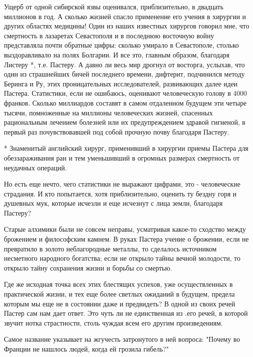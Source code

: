 Ущерб от  одной сибирской язвы оценивался,  приблизительно, в двадцать
миллионов  в год.  А сколько  жизней  спасло применение  его учения  в
хирургии и других областях медицины!  Один из наших известных хирургов
говорил  мне, что  смертность в  лазаретах Севастополя  и в  последнюю
восточную войну  представляла почти обратные цифры:  сколько умирало в
Севастополе,  столько выздоравливало  на  полях Болгарии.  И все  это,
главным  образом,  благодаря  Листеру  *, т.е.  Пастеру.  А  давно  ли
весь  мир  дрогнул  от  восторга, услыхав,  что  один  из  страшнейших
бичей последнего  времени, дифтерит,  подчинился методу Беринга  и Ру,
этих  проницательных исследователей,  развивающих далее  идеи Пастера.
Статистики,  если не  ошибаюсь, оценивают  человеческую голову  в 4000
франков.  Сколько  миллиардов  составят  в  самом  отдаленном  будущем
эти  четыре  тысячи,  помноженные  на  миллионы  человеческих  жизней,
спасенных  рациональным  лечением   болезней  или  их  предупреждением
здравой гигиеной, в первый раз почувствовавшей под собой прочную почву
благодаря Пастеру.

* Знаменитый английский хирург,  применивший в хирургии приемы Пастера
для  обеззараживания  ран  и   тем  уменьшивший  в  огромных  размерах
смертность от неудачных операций.

Но  есть  еще  нечто,  чего  статистики не  выражают  цифрами,  это  -
человеческие страдания. И кто попытается, хотя приблизительно, оценить
ту бездну горя  и душевных мук, которые исчезли и  еще исчезнут с лица
земли, благодаря Пастеру?

Старые алхимики  были не совсем неправы,  усматривая какое-то сходство
между  брожением  и  философским  камнем. В  руках  Пастера  учение  о
брожении,  если  не  превратило  в золото  неблагородные  металлы,  то
сделалось источником  несметного народного богатства; если  не открыло
тайны вечной молодости, то открыло  тайну сохранения жизни и борьбы со
смертью.

Где же исходная точка всех  этих блестящих успехов, уже осуществленных
в  практической жизни,  и тех  еще более  светлых ожиданий  в будущем,
предела которым  мы еще не в  состоянии даже и предвидеть?  В одной из
своих речей Пастер сам нам дает  ответ. Это чуть ли не единственная из
.его речей, в которой звучит  нотка страстности, столь чуждая всем его
другим произведениям.

Самое  название  указывает  на  жгучесть затронутого  в  ней  вопроса:
"Почему во Франции не нашлось людей, когда ей грозила гибель?"

